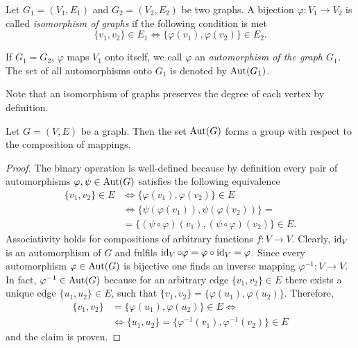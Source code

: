 \begin{defin}
\begin{thmlist}
\item Let $G_1=(V_1,E_1)$ and $G_2=(V_2,E_2)$ be two graphs. A bijection $\varphi\colon V_1 \to V_2$ is called \emph{isomorphism of graphs} if the following condition is met
\begin{equation*}
\lbrace v_1,v_2\rbrace\in E_1 \Leftrightarrow \lbrace \varphi(v_1),\varphi(v_2)\rbrace\in E_2.
\end{equation*}
\item If $G_1=G_2$, \ie $\varphi$ maps $V_1$ onto itself, we call $\varphi$ an \emph{automorphism of the graph $G_1$.} The set of all automorphisms onto $G_1$ is denoted by $\operatorname{Aut}(G_1)$.
\end{thmlist}
\end{defin}
\begin{rem}
Note that an isomorphism of graphs preserves the degree of each vertex by definition.
\end{rem}
\begin{thm}\label{thm:Graph-Automorphisms Form a Group}
Let $G=(V,E)$ be a graph. Then the set $\operatorname{Aut}(G)$ forms a group with respect to the composition of mappings.
\end{thm}
\begin{proof}
The binary operation is well-defined because by definition every pair of automorphisms $\varphi,\psi\in\operatorname{Aut}(G)$ satisfies the following equivalence
\begin{align*}
\lbrace v_1,v_2\rbrace\in E&\Leftrightarrow\lbrace \varphi(v_1),\varphi(v_2)\rbrace\in E\\
&\Leftrightarrow\lbrace \psi(\varphi(v_1)),\psi(\varphi(v_2))\rbrace=\\
&=\lbrace (\psi\circ\varphi)(v_1),(\psi\circ\varphi)(v_2)\rbrace\in E.
\end{align*}
Associativity holds for compositions of arbitrary functions $f\colon V\to V$. Clearly, $\operatorname{id}_V$ is an automorphism of $G$ and fulfils $\operatorname{id}_V\circ\varphi=\varphi\circ\operatorname{id}_V=\varphi$. Since every automorphism $\varphi\in\operatorname{Aut}(G)$ is bijective one finds an inverse mapping $\varphi^{-1}\colon V\to V$. In fact, $\varphi^{-1}\in\operatorname{Aut}(G)$ because for an arbitrary edge $\lbrace v_1,v_2\rbrace\in E$ there exists a unique edge $\lbrace u_1,u_2\rbrace\in E$, such that $\lbrace v_1,v_2\rbrace=\lbrace \varphi(u_1),\varphi(u_2)\rbrace$. Therefore,
\begin{align*}
\lbrace v_1,v_2\rbrace&=\lbrace \varphi(u_1),\varphi(u_2)\rbrace\in E\Leftrightarrow\\
&\Leftrightarrow \lbrace u_1,u_2\rbrace=\lbrace \varphi^{-1}(v_1),\varphi^{-1}(v_2)\rbrace\in E
\end{align*}
and the claim is proven.
\end{proof}